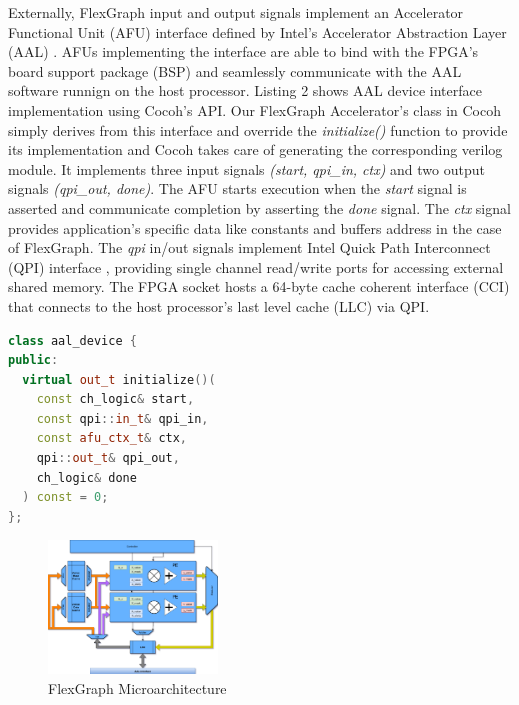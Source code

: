 Externally, FlexGraph input and output signals implement an Accelerator Functional Unit (AFU) interface defined by Intel's Accelerator Abstraction Layer (AAL) \cite{Intel-FPGA}. AFUs implementing the interface are able to bind with the FPGA's board support package (BSP) and seamlessly communicate with the AAL software runnign on the host processor. Listing 2 shows AAL device interface implementation using Cocoh's API. Our FlexGraph Accelerator's class in Cocoh simply derives from this interface and override the \textit{initialize()} function to provide its implementation and Cocoh takes care of generating the corresponding verilog module. It implements three input signals \textit{(start, qpi\_in, ctx)} and two output signals \textit{(qpi\_out, done)}. The AFU starts execution when the \textit{start} signal is asserted and communicate completion by asserting the \textit{done} signal. The \textit{ctx} signal provides application's specific data like constants and buffers address in the case of FlexGraph. The \textit{qpi} in/out signals implement Intel Quick Path Interconnect (QPI) interface \cite{QPI}, providing single channel read/write ports for accessing external shared memory. The FPGA socket hosts a 64-byte cache coherent interface (CCI) \cite{CCI} that connects to the host processor's last level cache (LLC) via QPI.     

\begin{lstlisting}[language=C++, caption=AAL Device Interface in Cocoh C++]
class aal_device {
public: 
  virtual out_t initialize()(
    const ch_logic& start, 
    const qpi::in_t& qpi_in, 
    const afu_ctx_t& ctx, 
    qpi::out_t& qpi_out, 
    ch_logic& done
  ) const = 0;  
};
\end{lstlisting}

\begin{figure}[htbp]
\centering
\includegraphics[width=0.4\textwidth]{figures/microarchitecture}
\caption{FlexGraph Microarchitecture}
\label{fig:microarchitecture}
\end{figure}


